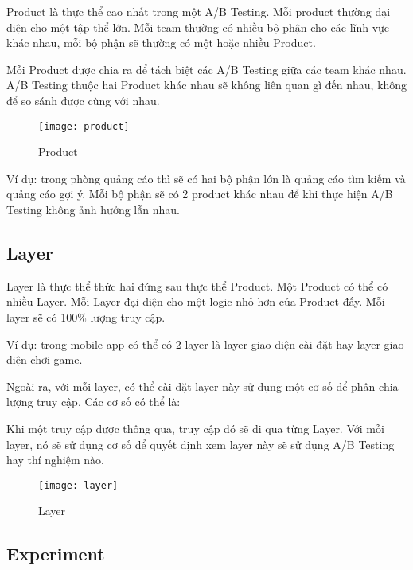 Product là thực thể cao nhất trong một A/B Testing. Mỗi product thường đại diện cho một tập thể lớn. Mỗi team thường có nhiều bộ phận cho các lĩnh vực khác nhau, mỗi bộ phận sẽ thường có một hoặc nhiều Product.

Mỗi Product được chia ra để tách biệt các A/B Testing giữa các team khác nhau. A/B Testing thuộc hai Product khác nhau sẽ không liên quan gì đến nhau, không để so sánh được cùng với nhau.

\begin{figure}[ht]
	\centering
	\texttt{[image: product]}
	\caption{Product}
\end{figure}

Ví dụ: trong phòng quảng cáo thì sẽ có hai bộ phận lớn là quảng cáo tìm kiếm và quảng cáo gợi ý. Mỗi bộ phận sẽ có 2 product khác nhau để khi thực hiện A/B Testing không ảnh hưởng lẫn nhau.

\subsection{Layer}

Layer là thực thể thức hai đứng sau thực thể Product. Một Product có thể có nhiều Layer. Mỗi Layer đại diện cho một logic nhỏ hơn của Product đấy. Mỗi layer sẽ có 100\% lượng truy cập.

Ví dụ: trong mobile app có thể có 2 layer là layer giao diện cài đặt hay layer giao diện chơi game.

Ngoài ra, với mỗi layer, có thể cài đặt layer này sử dụng một cơ số để phân chia lượng truy cập. Các cơ số có thể là:

\begin{itemize}
\end{itemize}

Khi một truy cập được thông qua, truy cập đó sẽ đi qua từng Layer. Với mỗi layer, nó sẽ sử dụng cơ số để quyết định xem layer này sẽ sử dụng A/B Testing hay thí nghiệm nào.

\begin{figure}[ht]
	\centering
	\texttt{[image: layer]}
	\caption{Layer}
\end{figure}

\subsection{Experiment}

